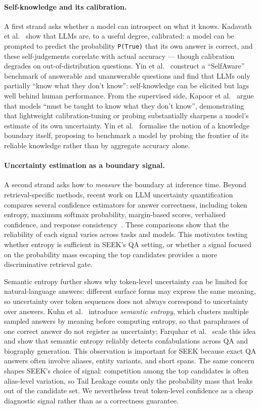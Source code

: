 \paragraph{Self-knowledge and its calibration.} A first strand asks whether a model can introspect on what it knows. Kadavath et al.~\cite{kadavath2022} show that LLMs are, to a useful degree, calibrated: a model can be prompted to predict the probability \texttt{P(True)} that its own answer is correct, and these self-judgements correlate with actual accuracy --- though calibration degrades on out-of-distribution questions. Yin et al.~\cite{yin2023} construct a ``SelfAware'' benchmark of answerable and unanswerable questions and find that LLMs only partially ``know what they don't know'': self-knowledge can be elicited but lags well behind human performance. From the supervised side, Kapoor et al.~\cite{kapoor2024} argue that models ``must be taught to know what they don't know'', demonstrating that lightweight calibration-tuning or probing substantially sharpens a model's estimate of its own uncertainty. Yin et al.~\cite{yin2024} formalise the notion of a knowledge boundary itself, proposing to benchmark a model by probing the frontier of its reliable knowledge rather than by aggregate accuracy alone.

\paragraph{Uncertainty estimation as a boundary signal.} A second strand asks how to \emph{measure} the boundary at inference time. Beyond retrieval-specific methods, recent work on LLM uncertainty quantification compares several confidence estimators for answer correctness, including token entropy, maximum softmax probability, margin-based scores, verbalised confidence, and response consistency~\cite{maqa}. These comparisons show that the reliability of each signal varies across tasks and models. This motivates testing whether entropy is sufficient in SEEK's QA setting, or whether a signal focused on the probability mass escaping the top candidates provides a more discriminative retrieval gate.

Semantic entropy further shows why token-level uncertainty can be limited for natural-language answers: different surface forms may express the same meaning, so uncertainty over token sequences does not always correspond to uncertainty over answers. Kuhn et al.~\cite{semanticuncertainty} introduce \emph{semantic entropy}, which clusters multiple sampled answers by meaning before computing entropy, so that paraphrases of one correct answer do not register as uncertainty; Farquhar et al.~\cite{semanticentropy} scale this idea and show that semantic entropy reliably detects confabulations across QA and biography generation. This observation is important for SEEK because exact QA answers often involve aliases, entity variants, and short spans. The same concern shapes SEEK's choice of signal: competition among the top candidates is often alias-level variation, so Tail Leakage counts only the probability mass that leaks out of the candidate set. We nevertheless treat token-level confidence as a cheap diagnostic signal rather than as a correctness guarantee.

